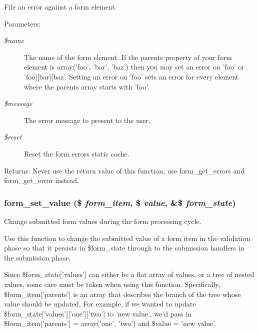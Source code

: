File an error against a form element.

\begin{Desc}
\item[Parameters:]
\begin{description}
\item[{\em \$name}]The name of the form element. If the parents property of your form element is array('foo', 'bar', 'baz') then you may set an error on 'foo' or 'foo\mbox{]}\mbox{[}bar\mbox{]}\mbox{[}baz'. Setting an error on 'foo' sets an error for every element where the parents array starts with 'foo'. \item[{\em \$message}]The error message to present to the user. \item[{\em \$reset}]Reset the form errors static cache. \end{description}
\end{Desc}
\begin{Desc}
\item[Returns:]Never use the return value of this function, use form\_\-get\_\-errors and form\_\-get\_\-error instead. \end{Desc}
\hypertarget{group__form__api_ga7635bbcb1cb510fcc0cdc265e9ddea7}{
\subsubsection[{form\_\-set\_\-value}]{\setlength{\rightskip}{0pt plus 5cm}form\_\-set\_\-value (\$ {\em form\_\-item}, \/  \$ {\em value}, \/  \&\$ {\em form\_\-state})}}
\label{group__form__api_ga7635bbcb1cb510fcc0cdc265e9ddea7}


Change submitted form values during the form processing cycle.

Use this function to change the submitted value of a form item in the validation phase so that it persists in \$form\_\-state through to the submission handlers in the submission phase.

Since \$form\_\-state\mbox{[}'values'\mbox{]} can either be a flat array of values, or a tree of nested values, some care must be taken when using this function. Specifically, \$form\_\-item\mbox{[}'parents'\mbox{]} is an array that describes the branch of the tree whose value should be updated. For example, if we wanted to update \$form\_\-state\mbox{[}'values'\mbox{]}\mbox{[}'one'\mbox{]}\mbox{[}'two'\mbox{]} to 'new value', we'd pass in \$form\_\-item\mbox{[}'parents'\mbox{]} = array('one', 'two') and \$value = 'new value'.

